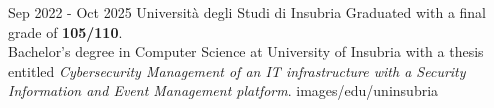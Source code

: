 {Sep 2022 - Oct 2025}
{Università degli Studi di Insubria}
{Graduated with a final grade of \textbf{105/110}.\\
Bachelor's degree in Computer Science at University of Insubria
with a thesis entitled 
\textit{Cybersecurity Management of an IT
infrastructure with a Security Information and Event Management
platform}.
}
{images/edu/uninsubria}
